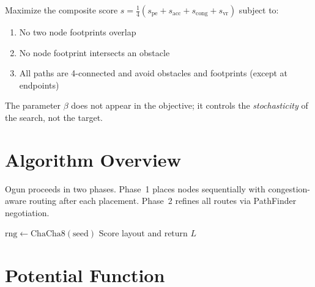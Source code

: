 \documentclass[11pt,a4paper]{article}
\begin{document}
Maximize the composite score $s = \frac{1}{4}(s_\text{pe} + s_\text{acc} +
s_\text{cong} + s_\text{vr})$ subject to:
\begin{enumerate}
    \item No two node footprints overlap
    \item No node footprint intersects an obstacle
    \item All paths are 4-connected and avoid obstacles and footprints (except at endpoints)
\end{enumerate}

The parameter $\beta$ does not appear in the objective; it controls the
\emph{stochasticity} of the search, not the target.

\section{Algorithm Overview}

Ogun proceeds in two phases. Phase~1 places nodes sequentially with
congestion-aware routing after each placement. Phase~2 refines all routes via
PathFinder negotiation.

\begin{algorithm}[H]
\SetAlgoLined
{}
$\text{rng} \gets \text{ChaCha8}(\text{seed})$\;
Score layout and return $L$\;
\caption{Ogun: Sequential Logit Dynamics with Negotiated Routing}
\end{algorithm}

\section{Potential Function}
\end{document}
